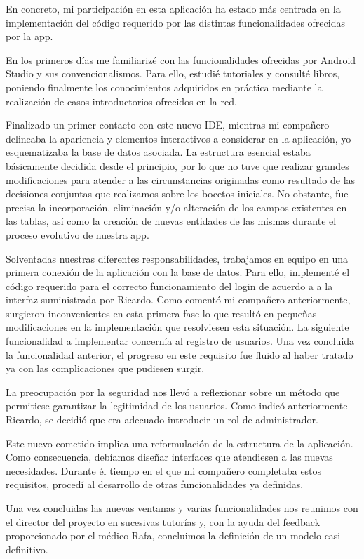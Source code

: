 \documentclass[11pt,spanish,
		listoftables,listoffigures]
		{tfgplantilla}
\begin{document}
En concreto, mi participación en esta aplicación ha estado más centrada en la implementación del código requerido por las distintas funcionalidades ofrecidas por la app.

En los primeros días me familiarizé con las funcionalidades ofrecidas por Android Studio y sus convencionalismos. Para ello, estudié tutoriales y consulté libros, poniendo finalmente los conocimientos adquiridos en práctica mediante la realización de casos introductorios ofrecidos en la red.

Finalizado un primer contacto con este nuevo IDE, mientras mi compañero delineaba la apariencia y elementos interactivos a considerar en la aplicación, yo esquematizaba la base de datos asociada. La estructura esencial estaba básicamente decidida desde el principio, por lo que no tuve que realizar grandes modificaciones para atender a las circunstancias originadas como resultado de las decisiones conjuntas que realizamos sobre los bocetos iniciales. No obstante, fue precisa la incorporación, eliminación y/o alteración de los campos existentes en las tablas, así como la creación de nuevas entidades de las mismas durante el proceso evolutivo de nuestra app. 

Solventadas nuestras diferentes responsabilidades, trabajamos en equipo en una primera conexión de la aplicación con la base de datos. Para ello, implementé el código requerido para el correcto funcionamiento del login de acuerdo a a la interfaz suministrada por Ricardo. Como comentó mi compañero anteriormente, surgieron inconvenientes en esta primera fase lo que resultó en pequeñas modificaciones en la implementación que resolviesen esta situación.
La siguiente funcionalidad a implementar concernía al registro de usuarios. Una vez concluida la funcionalidad anterior, el progreso en este requisito fue fluido al haber tratado ya con las complicaciones que pudiesen surgir.

La preocupación por la seguridad nos llevó a reflexionar sobre un método que permitiese garantizar la legitimidad de los usuarios. Como indicó anteriormente Ricardo, se decidió que era adecuado introducir un rol de administrador.

Este nuevo cometido implica una reformulación de la estructura de la aplicación. Como consecuencia, debíamos diseñar interfaces que atendiesen a las nuevas necesidades. Durante él tiempo en el que mi compañero completaba estos requisitos, procedí al desarrollo de otras funcionalidades ya definidas.

Una vez concluidas las nuevas ventanas y varias funcionalidades nos reunimos con el director del proyecto en sucesivas tutorías y, con la ayuda del feedback proporcionado por el médico Rafa, concluimos la definición de un modelo casi definitivo. 
\end{document}
